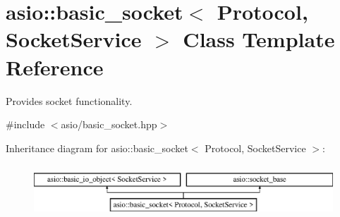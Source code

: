 \hypertarget{classasio_1_1basic__socket}{}\section{asio\+:\+:basic\+\_\+socket$<$ Protocol, Socket\+Service $>$ Class Template Reference}
\label{classasio_1_1basic__socket}


Provides socket functionality.  




{\ttfamily \#include $<$asio/basic\+\_\+socket.\+hpp$>$}

Inheritance diagram for asio\+:\+:basic\+\_\+socket$<$ Protocol, Socket\+Service $>$\+:\begin{figure}[H]
\begin{center}
\leavevmode
\includegraphics[height=1.971831cm]{classasio_1_1basic__socket}
\end{center}
\end{figure}
